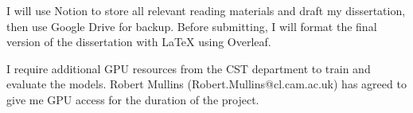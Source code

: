 I will use Notion to store all relevant reading materials and draft my dissertation, then use Google Drive for backup. Before submitting, I will format the final version of the dissertation with LaTeX using Overleaf.

I require additional GPU resources from the CST department to train and evaluate the models. Robert Mullins (Robert.Mullins@cl.cam.ac.uk) has agreed to give me GPU access for the duration of the project.

